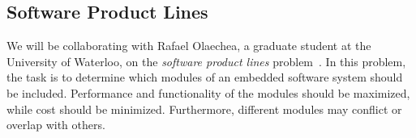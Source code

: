 \documentclass[11pt]{article}
\begin{document}
\subsection{Software Product Lines}\label{sec:sw_product_lines}

We will be collaborating with Rafael Olaechea, a graduate student at
the University of Waterloo, on the \textit{software product lines}
problem~\cite{ref:Olaechea12}. In this problem, the task is to
determine which modules of an embedded software system should be
included. Performance and functionality of the modules should be
maximized, while cost should be minimized. Furthermore, different
modules may conflict or overlap with others.


\printbibliography[heading=bibintoc]
\end{document}

